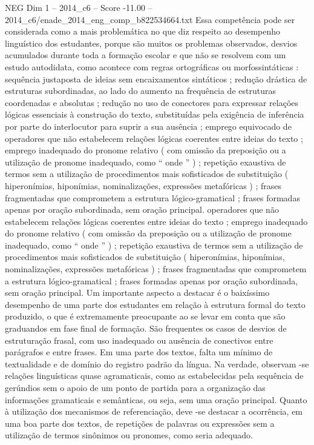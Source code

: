 \begin{textsample}{NEG Dim 1 – 2014\_c6 – Score -11.00 – 2014\_c6/enade\_2014\_eng\_comp\_b822534664.txt}
Essa competência pode ser considerada como a mais problemática no que diz respeito ao desempenho linguístico dos estudantes, porque são muitos os problemas observados, desvios acumulados durante toda a formação escolar e que não se resolvem com um estudo autodidata, como acontece com regras ortográficas ou morfossintáticas : sequência justaposta de ideias sem encaixamentos sintáticos ; redução drástica de estruturas subordinadas, ao lado do aumento na frequência de estruturas coordenadas e absolutas ; redução no uso de conectores para expressar relações lógicas essenciais à construção do texto, substituídas pela exigência de inferência por parte do interlocutor para suprir a sua ausência ; emprego equivocado de operadores que não estabelecem relações lógicas coerentes entre ideias do texto ; emprego inadequado do pronome relativo ( com omissão da preposição ou a utilização de pronome inadequado, como “ onde ” ) ; repetição exaustiva de termos sem a utilização de procedimentos mais sofisticados de substituição ( hiperonímias, hiponímias, nominalizações, expressões metafóricas ) ; frases fragmentadas que comprometem a estrutura lógico-gramatical ; frases formadas apenas por oração subordinada, sem oração principal. operadores que não estabelecem relações lógicas coerentes entre ideias do texto ; emprego inadequado do pronome relativo ( com omissão da preposição ou a utilização de pronome inadequado, como “ onde ” ) ; repetição exaustiva de termos sem a utilização de procedimentos mais sofisticados de substituição ( hiperonímias, hiponímias, nominalizações, expressões metafóricas ) ; frases fragmentadas que comprometem a estrutura lógico-gramatical ; frases formadas apenas por oração subordinada, sem oração principal.
Um importante aspecto a destacar é o baixíssimo desempenho de uma parte dos estudantes em relação à estrutura formal do texto produzido, o que é extremamente preocupante ao se levar em conta que são graduandos em fase final de formação.
São frequentes os casos de desvios de estruturação frasal, com uso inadequado ou ausência de conectivos entre parágrafos e entre frases.
Em uma parte dos textos, falta um mínimo de textualidade e de domínio do registro padrão da língua.
Na verdade, observam -se relações linguísticas quase agramaticais, como as estabelecidas pela sequência de gerúndios sem o apoio de um ponto de partida para a organização das informações gramaticais e semânticas, ou seja, sem uma oração principal.
Quanto à utilização dos mecanismos de referenciação, deve -se destacar a ocorrência, em uma boa parte dos textos, de repetições de palavras ou expressões sem a utilização de termos sinônimos ou pronomes, como seria adequado.

\end{textsample}
